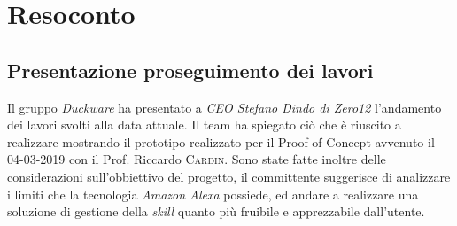 \clearpage
\section{Resoconto}
	\subsection{Presentazione proseguimento dei lavori}
	\label{sec:presentazione_proseguimento_lavori}
	Il gruppo \emph{Duckware} ha presentato a \emph{CEO Stefano Dindo di Zero12} l'andamento dei lavori svolti alla data attuale. Il team ha spiegato ciò che è riuscito a realizzare mostrando il prototipo realizzato per il Proof of Concept avvenuto il 04-03-2019 con il Prof. Riccardo \textsc{Cardin}. Sono state fatte inoltre delle considerazioni sull'obbiettivo del progetto, il committente suggerisce di analizzare i limiti che la tecnologia \textit{Amazon Alexa} possiede, ed andare a realizzare una soluzione di gestione della \textit{skill} quanto più fruibile e apprezzabile dall'utente. 
